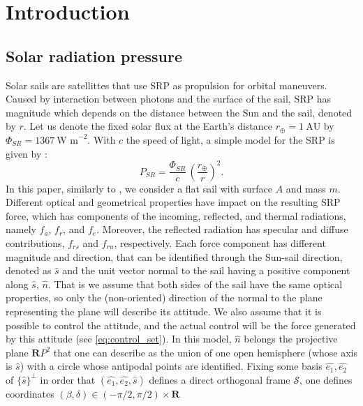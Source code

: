 \documentclass[AMA,STIX1COL]{WileyNJD-v2}
\newcommand{\uvect}[1]{\hat{#1}}
\newcommand{\vect}[1]{#1}
\newcommand{\R}{\mathbf{R}}
\begin{document}
\section{Introduction}

\subsection{Solar radiation pressure} \label{ssec:force}
Solar sails are satellittes that use \ac{SRP} as propulsion for orbital maneuvers. Caused by interaction between photons and the surface of the sail, \ac{SRP} has magnitude which depends on the distance between the Sun and  the sail, denoted by $r$. Let us denote the fixed solar flux at the Earth's distance $r_{\oplus} = 1\ \text{AU}$ by $\Phi_{SR} = 1367 \ \text{W m}^{-2}$. With $c$ the speed of light, a simple model for the \ac{SRP} is given by \cite[Chap.~3]{Montenbruck_2000}:
\begin{equation}
	\label{eq:pressure}
	P_{SR} = \dfrac{\Phi_{SR}}{c} \, \left(\dfrac{r_\oplus}{r}\right)^2.
\end{equation}
In this paper, similarly to \cite{Herasimenka_2023}, we consider a flat sail with surface $A$ and mass $m$. Different
optical and geometrical properties have impact on the resulting \ac{SRP} force, which has components of the incoming,
reflected, and thermal radiations, namely $\vect{f}_a$, $\vect{f}_r$, and $\vect{f}_e$. Moreover, the reflected
radiation has specular and diffuse contributions, $\vect{f}_{rs}$ and $\vect{f}_{ru}$, respectively. Each force
component has different magnitude and direction, that can be identified through the Sun-sail direction, denoted as
$\uvect{s}$ and the unit vector normal to the sail having a positive component along $\uvect{s}$, $\uvect{n}$.
That is we assume that both sides of the sail have the same optical properties, so only the (non-oriented)
direction of the normal to the plane representing the plane will describe its attitude.
We also assume that it is possible to control the attitude, and the actual control will be the force
generated by this attitude (see \eqref{eq:control_set}).
In this model, $\uvect{n}$ belongs the projective plane $\R P^2$ that one can describe as the union of one open
hemisphere (whose axis is $\uvect{s}$)
with a circle whose antipodal points are identified.
Fixing some basis ${\uvect{e_1},\uvect{e_2}}$ of
$\{\uvect{s}\}^\perp$ in order that $(\uvect{e_1},\uvect{e_2},\uvect{s})$ defines
a direct orthogonal frame $\mathcal{S}$,
one defines coordinates $(\beta,\delta) \in (-\pi/2,\pi/2) \times \R$
\end{document}
